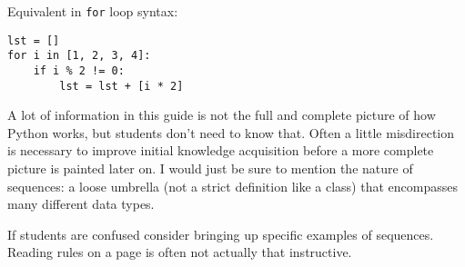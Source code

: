 \begin{blocksection}
Equivalent in \lstinline{for} loop syntax:

\begin{lstlisting}
lst = []
for i in [1, 2, 3, 4]:
    if i % 2 != 0:
        lst = lst + [i * 2]
\end{lstlisting}
\end{blocksection}

\begin{guide}
A lot of information in this guide is not the full and complete picture of how Python works, but students don't need to know that. Often a little misdirection is necessary to improve initial knowledge acquisition before a more complete picture is painted later on. I would just be sure to mention the nature of sequences: a loose umbrella (not a strict definition like a class) that encompasses many different data types. 

If students are confused consider bringing up specific examples of sequences. Reading rules on a page is often not actually that instructive. 
\end{guide}
